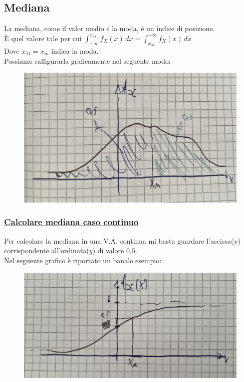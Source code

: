 \documentclass{article}
\begin{document}
\subsection{Mediana}
La mediana, come il valor medio e la moda, è un indice di posizione. \\
È quel valore tale per cui $\int_{-\infty}^{x_M} f_X(x) \,dx = \int_{x_M}^{+\infty} f_X(x) \,dx$ \\
Dove $x_M = x_m$ indica la moda. \\
Possiamo raffigurarla graficamente nel seguente modo:
\begin{figure}[ht]
\centering
\includegraphics[scale=0.10]{images/53.Mediana.jpeg}
\end{figure} 
\subsubsection{\underline{Calcolare mediana caso continuo}}
Per calcolare la mediana in una V.A. continua mi basta guardare l’ascissa($x$) corrispondente all’ordinata($y$) di valore $0.5$. \\
Nel seguente grafico è riportato un banale esempio:
\begin{figure}[ht]
\centering
\includegraphics[scale=0.10]{images/54.MedianaContinua.jpeg}
\end{figure} 
\end{document}
